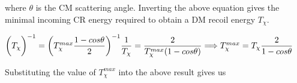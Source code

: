\documentclass[fleqn]{article}
\begin{document}
where $\theta$ is the CM scattering angle. Inverting the above equation gives the minimal incoming CR energy 
required to obtain a DM recoil energy $T_{\chi}$.

\vspace{10px}

$
  \\
  \bigg( T_{\chi} \bigg)^{-1}=\bigg( T^{max}_{\chi} \dfrac{1- cos \theta}{2} \bigg)^{-1} 
  \\
  \\
  \\
  \dfrac{1}{T_{\chi}}=\dfrac{2}{T^{max}_{\chi}(1-cos \theta)}
  \Longrightarrow T^{max}_{\chi}=T_{\chi} \dfrac{2}{1-cos \theta}
  \\
  \\
$

Substituting the value of $T^{max}_{\chi}$ into the above result gives us
\end{document}

